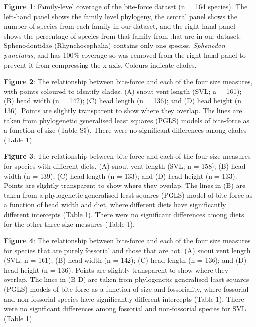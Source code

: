 \documentclass[a4paper, 12pt]{article}
\begin{document}
\textbf{Figure 1}: 
  Family-level coverage of the bite-force dataset (n = 164 species). 
  The left-hand panel shows the family level phylogeny, the central panel shows the number of species from each family in our dataset, and the right-hand panel shows the percentage of species from that family from\cite{uetz2020reptile} that are in our dataset. 
  Sphenodontidae (Rhynchocephalia) contains only one species, \textit{Sphenodon punctatus}, and has 100\% coverage so was removed from the right-hand panel to prevent it from compressing the x-axis. 
  Colours indicate clades.


\textbf{Figure 2}: 
  The relationship between bite-force and each of the four size measures, with points coloured to identify clades. 
  (A) snout vent length (SVL; n = 161); (B) head width (n = 142); (C) head length (n = 136); and (D) head height (n = 136). 
  Points are slightly transparent to show where they overlap. 
  The lines are taken from phylogenetic generalised least squares (PGLS) models of bite-force as a function of size (Table S5). 
  There were no significant differences among clades (Table 1). 

\textbf{Figure 3}: 
  The relationship between bite-force and each of the four size measures for species with different diets. 
  (A) snout vent length (SVL; n = 158); (B) head width (n = 139); (C) head length (n = 133); and (D) head height (n = 133). 
  Points are slightly transparent to show where they overlap. 
  The lines in (B) are taken from a phylogenetic generalised least squares (PGLS) model of bite-force as a function of head width and diet, where different diets have significantly different intercepts (Table 1). 
  There were no significant differences among diets for the other three size measures (Table 1).


\textbf{Figure 4}: 
  The relationship between bite-force and each of the four size measures for species that are purely fossorial and those that are not. 
  (A) snout vent length (SVL; n = 161); (B) head width (n = 142); (C) head length (n = 136); and (D) head height (n = 136). 
  Points are slightly transparent to show where they overlap. 
  The lines in (B-D) are taken from phylogenetic generalised least squares (PGLS) models of bite-force as a function of size and fossoriality, where fossorial and non-fossorial species have significantly different intercepts (Table 1). 
  There were no significant differences among fossorial and non-fossorial species for SVL (Table 1). 

\end{document}
